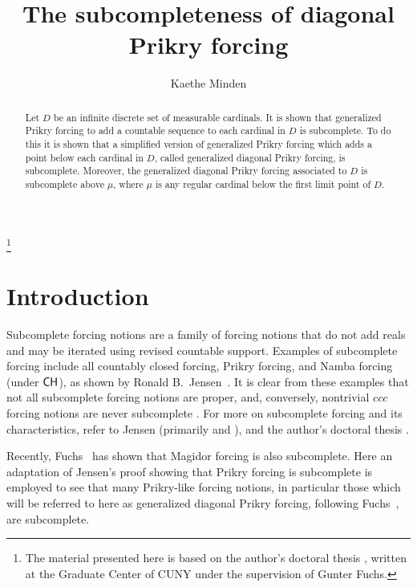 \documentclass{amsart}
\theoremstyle{definition}
\theoremstyle{remark}
\newcommand{\CH}{\textup{\textsf{CH}}}
\begin{document}
\title{The subcompleteness of diagonal Prikry forcing}
\author{Kaethe Minden}
 \address[K.~Minden]{Mathematics, Marlboro College, 2582 South Road, Marlboro, VT 05344}
\date{}     					
\thanks{The material presented here is based on the author's doctoral thesis \cite{Minden:2017fr}, written at the Graduate Center of CUNY under the supervision of Gunter Fuchs.}


\begin{abstract}
Let \(D\) be an infinite discrete set of measurable cardinals. It is shown that generalized Prikry forcing to add a countable sequence to each cardinal in \(D\) is subcomplete. To do this it is shown that a simplified version of generalized Prikry forcing which adds a point below each cardinal in \(D\), called generalized diagonal Prikry forcing, is subcomplete. Moreover, the generalized diagonal Prikry forcing associated to \(D\) is subcomplete above $\mu$, where $\mu$ is any regular cardinal below the first limit point of \(D\).
\end{abstract}
\maketitle
\section{Introduction}
Subcomplete forcing notions are a family of forcing notions that do not add reals and may be iterated using revised countable support. Examples of subcomplete forcing include all countably closed forcing, Prikry forcing, and Namba forcing (under $\CH$), as shown by Ronald B.~Jensen~\cite[Section 3.3]{Jensen:2014}. It is clear from these examples that not all subcomplete forcing notions are proper, and, conversely, nontrivial $ccc$ forcing notions are never subcomplete \cite{Minden:2017fr}. For more on subcomplete forcing and its characteristics, refer to Jensen (primarily \cite{Jensen:2014} and \cite{Jensen:2009fe}), and the author's doctoral thesis \cite{Minden:2017fr}.

Recently, Fuchs~\cite{Fuchs:2017Magidor} has shown that Magidor forcing is also subcomplete. Here an adaptation of Jensen's proof showing that Prikry forcing is subcomplete is employed to see that many Prikry-like forcing notions, in particular those which will be referred to here as generalized diagonal Prikry forcing, following Fuchs~\cite{Fuchs:2005kx}, are subcomplete.
\end{document}
